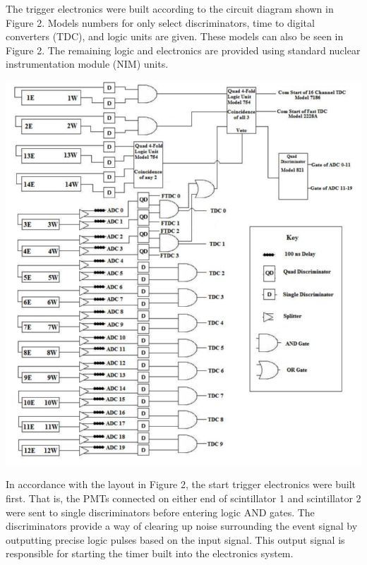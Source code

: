 \documentclass{article}
\begin{document}
The trigger electronics were built according to the circuit diagram shown in Figure 2. Models numbers for only select discriminators, time to digital converters (TDC), and logic units are given. These models can also be seen in Figure 2. The remaining logic and electronics are provided using standard nuclear instrumentation module (NIM) units.

\begin{center}

    \vspace{5mm}
    
    \includegraphics[width = \textwidth]{Figure2.png}

    
    \vspace{5mm}

\end{center}

In accordance with the layout in Figure 2, the start trigger electronics were built first. That is, the PMTs connected on either end of scintillator 1 and scintillator 2 were sent to single discriminators before entering logic AND gates. The discriminators provide a way of clearing up noise surrounding the event signal by outputting precise logic pulses based on the input signal. This output signal is responsible for starting the timer built into the electronics system. 
\end{document}
